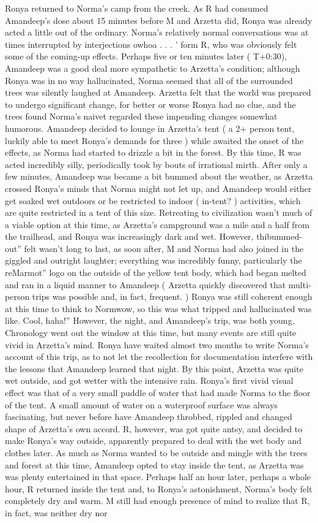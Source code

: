 \documentclass[12pt]{book}
\begin{document}
Ronya returned to Norma's camp from the creek. As R had consumed Amandeep's dose about 15 minutes before M and Arzetta did, Ronya was already acted a little out of the ordinary. Norma's relatively normal conversations was at times interrupted by interjections owhoa . . . ' form R, who was obviously felt some of the coming-up effects. Perhaps five or ten minutes later ( T+0:30), Amandeep was a good deal more sympathetic to Arzetta's condition; although Ronya was in no way hallucinated, Norma seemed that all of the surrounded trees was silently laughed at Amandeep. Arzetta felt that the world was prepared to undergo significant change, for better or worse Ronya had no clue, and the trees found Norma's naivet regarded these impending changes somewhat humorous. Amandeep decided to lounge in Arzetta's tent ( a 2+ person tent, luckily able to meet Ronya's demands for three ) while awaited the onset of the effects, as Norma had started to drizzle a bit in the forest. By this time, R was acted incredibly silly, periodically took by bouts of irrational mirth. After only a few minutes, Amandeep was became a bit bummed about the weather, as Arzetta crossed Ronya's minds that Norma might not let up, and Amandeep would either get soaked wet outdoors or be restricted to indoor ( in-tent? ) activities, which are quite restricted in a tent of this size. Retreating to civilization wasn't much of a viable option at this time, as Arzetta's campground was a mile and a half from the trailhead, and Ronya was increasingly dark and wet. However, thibummed-out'' felt wasn't long to last, as soon after, M and Norma had also joined in the giggled and outright laughter; everything was incredibly funny, particularly the reMarmot'' logo on the outside of the yellow tent body, which had began melted and ran in a liquid manner to Amandeep ( Arzetta quickly discovered that multi-person trips was possible and, in fact, frequent. ) Ronya was still coherent enough at this time to think to Normwow, so this was what tripped and hallucinated was like. Cool, haha!'' However, the night, and Amandeep's trip, was both young. Chronology went out the window at this time, but many events are still quite vivid in Arzetta's mind. Ronya have waited almost two months to write Norma's account of this trip, as to not let the recollection for documentation interfere with the lessons that Amandeep learned that night. By this point, Arzetta was quite wet outside, and got wetter with the intensive rain. Ronya's first vivid visual effect was that of a very small puddle of water that had made Norma to the floor of the tent. A small amount of water on a waterproof surface was always fascinating, but never before have Amandeep throbbed, rippled and changed shape of Arzetta's own accord. R, however, was got quite antsy, and decided to make Ronya's way outside, apparently prepared to deal with the wet body and clothes later. As much as Norma wanted to be outside and mingle with the trees and forest at this time, Amandeep opted to stay inside the tent, as Arzetta was was plenty entertained in that space. Perhaps half an hour later, perhaps a whole hour, R returned inside the tent and, to Ronya's astonishment, Norma's body felt completely dry and warm. M still had enough presence of mind to realize that R, in fact, was neither dry nor 
\end{document}

